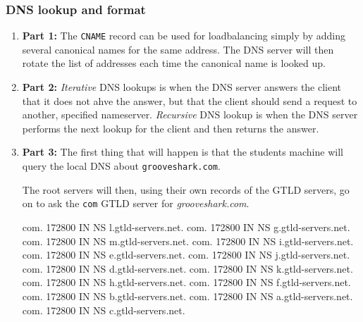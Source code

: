 \documentclass[10pt]{article}
\begin{document}
\subsubsection{DNS lookup and format}
\begin{enumerate}
  \item \textbf{Part 1:} The \texttt{CNAME} record can be used for loadbalancing
        simply by adding several canonical names for the same address. The DNS
        server will then rotate the list of addresses each time the canonical
        name is looked up.
  \item \textbf{Part 2:} \textit{Iterative} DNS lookups is when the DNS server
        answers the client that it does not ahve the answer, but that the client
        should send a request to another, specified nameserver.
        \textit{Recursive} DNS lookup is when the DNS server performs the next
        lookup for the client and then returns the answer.
  \item \textbf{Part 3:}
        The first thing that will happen is that the students machine will query
        the local DNS about \texttt{grooveshark.com}.
      The root servers will then, using their own records of the GTLD servers,
      go on to ask the \texttt{com} GTLD server for \textit{grooveshark.com}.
\begin{verbatim*}
com.			172800	IN	NS	l.gtld-servers.net.
com.			172800	IN	NS	g.gtld-servers.net.
com.			172800	IN	NS	m.gtld-servers.net.
com.			172800	IN	NS	i.gtld-servers.net.
com.			172800	IN	NS	e.gtld-servers.net.
com.			172800	IN	NS	j.gtld-servers.net.
com.			172800	IN	NS	d.gtld-servers.net.
com.			172800	IN	NS	k.gtld-servers.net.
com.			172800	IN	NS	h.gtld-servers.net.
com.			172800	IN	NS	f.gtld-servers.net.
com.			172800	IN	NS	b.gtld-servers.net.
com.			172800	IN	NS	a.gtld-servers.net.
com.			172800	IN	NS	c.gtld-servers.net.

\end{verbatim*}
\end{enumerate}
\end{document}

